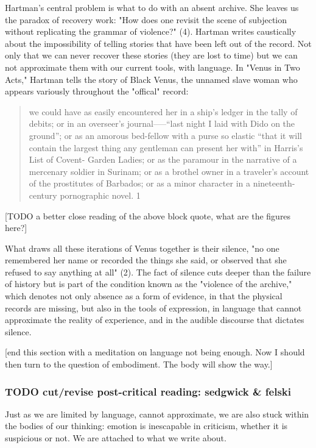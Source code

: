 \documentclass[11pt]{article}
\begin{document}
Hartman's central problem is what to do with an absent archive. She
leaves us the paradox of recovery work: "How does one revisit the
scene of subjection without replicating the grammar of violence?"
(4). Hartman writes caustically about the impossibility of telling
stories that have been left out of the record. Not only that we can
never recover these stories (they are lost to time) but we can not
approximate them with our current tools, with language. In "Venus in
Two Acts," Hartman tells the story of Black Venus, the unnamed slave
woman who appears variously throughout the "offical" record:

\begin{quote}
we could have as easily encountered her in a ship’s ledger in the
tally of debits; or in an overseer’s journal—--“last night I laid with
Dido on the ground”; or as an amorous bed-fellow with a purse so
elastic “that it will contain the largest thing any gentleman can
present her with” in Harris’s List of Covent- Garden Ladies; or as the
paramour in the narrative of a mercenary soldier in Surinam; or as a
brothel owner in a traveler’s account of the prostitutes of Barbados;
or as a minor character in a nineteenth-century pornographic novel. 1
\end{quote}

[TODO a better close reading of the above block quote, what are the
figures here?]  

What draws all these iterations of Venus together is their silence,
"no one remembered her name or recorded the things she said, or
observed that she refused to say anything at all" (2). The fact of
silence cuts deeper than the failure of history but is part of the
condition known as the "violence of the archive," which denotes not
only absence as a form of evidence, in that the physical records are
missing, but also in the tools of expression, in language that cannot
approximate the reality of experience, and in the audible discourse
that dictates silence.

[end this section with a meditation on language not being enough. Now
I should then turn to the question of embodiment. The body will show
the way.]

\subsubsection{{\bfseries\sffamily TODO} cut/revise post-critical reading: sedgwick \& felski}
\label{sec:org29db3e8}
Just as we are limited by language, cannot approximate, we are also
stuck within the bodies of our thinking: emotion is inescapable in
criticism, whether it is suspicious or not. We are attached to what we
write about.
\end{document}
